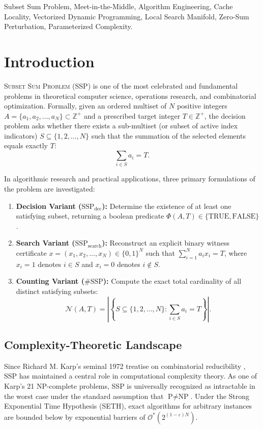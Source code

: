 \documentclass[journal,onecolumn,11pt]{IEEEtran}
\begin{document}
\begin{IEEEkeywords}
Subset Sum Problem, Meet-in-the-Middle, Algorithm Engineering, Cache Locality, Vectorized Dynamic Programming, Local Search Manifold, Zero-Sum Perturbation, Parameterized Complexity.
\end{IEEEkeywords}

\section{Introduction}
\label{sec:introduction}

 \textsc{Subset Sum Problem} (SSP) is one of the most celebrated and fundamental problems in theoretical computer science, operations research, and combinatorial optimization. Formally, given an ordered multiset of $N$ positive integers $A = \{a_1, a_2, \dots, a_N\} \subset \mathbb{Z}^+$ and a prescribed target integer $T \in \mathbb{Z}^+$, the decision problem asks whether there exists a sub-multiset (or subset of active index indicators) $S \subseteq \{1, 2, \dots, N\}$ such that the summation of the selected elements equals exactly $T$:
\begin{equation}
    \sum_{i \in S} a_i = T.
    \label{eq:ssp_core}
\end{equation}

In algorithmic research and practical applications, three primary formulations of the problem are investigated:
\begin{enumerate}
    \item \textbf{Decision Variant ($\text{SSP}_{\text{dec}}$):} Determine the existence of at least one satisfying subset, returning a boolean predicate $\Phi(A, T) \in \{\text{TRUE}, \text{FALSE}\}$.
    \item \textbf{Search Variant ($\text{SSP}_{\text{search}}$):} Reconstruct an explicit binary witness certificate $x = (x_1, x_2, \dots, x_N) \in \{0, 1\}^N$ such that $\sum_{i=1}^N a_i x_i = T$, where $x_i = 1$ denotes $i \in S$ and $x_i = 0$ denotes $i \notin S$.
    \item \textbf{Counting Variant ($\#\text{SSP}$):} Compute the exact total cardinality of all distinct satisfying subsets:
    \begin{equation}
        \mathcal{N}(A, T) = \left| \left\{ S \subseteq \{1, 2, \dots, N\} : \sum_{i \in S} a_i = T \right\} \right|.
    \end{equation}
\end{enumerate}

\subsection{Complexity-Theoretic Landscape}
Since Richard M. Karp's seminal 1972 treatise on combinatorial reducibility \cite{karp1972reducibility}, SSP has maintained a central role in computational complexity theory. As one of Karp's 21 NP-complete problems, SSP is universally recognized as intractable in the worst case under the standard assumption that $\text{P} \neq \text{NP}$. Under the Strong Exponential Time Hypothesis (SETH), exact algorithms for arbitrary instances are bounded below by exponential barriers of $\mathcal{O}^*(2^{(1-\varepsilon)N})$.
\end{document}
